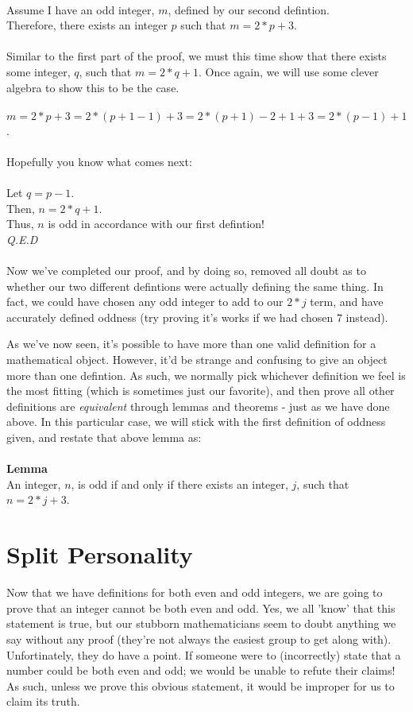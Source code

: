 \documentclass[a4paper,12pt]{article}
\begin{document}
\\
Assume I have an odd integer, $m$, defined by our second defintion.\\
Therefore, there exists an integer $p$ such that $m = 2*p + 3$.\\
\\
Similar to the first part of the proof, we must this time show that there exists some integer, $q$, such that $m = 2*q + 1$. Once again, we will use some clever algebra to show this to be the case.\\
\\
$m = 2*p + 3 = 2*(p + 1 - 1) + 3 = 2*(p + 1) - 2+1 + 3 = 2*(p - 1) + 1$.\\
\\
Hopefully you know what comes next:\\
\\
Let $q = p - 1$.\\
Then, $n = 2*q + 1$.\\
Thus, $n$ is odd in accordance with our first defintion!\\
\textit{Q.E.D}\\
\\
Now we've completed our proof, and by doing so, removed all doubt as to whether our two different defintions were actually defining the same thing. In fact, we could have chosen any odd integer to add to our $2*j$ term, and have accurately defined oddness (try proving it's works if we had chosen $7$ instead). 

As we've now seen, it's possible to have more than one valid definition for a mathematical object. However, it'd be strange and confusing to give an object more than one defintion. As such, we normally pick whichever definition we feel is the most fitting (which is sometimes just our favorite), and then prove all other definitions are \textit{equivalent} through lemmas and theorems - just as we have done above. In this particular case, we will stick with the first definition of oddness given, and restate that above lemma as:\\
\\
\textbf{Lemma}\\
An integer, $n$, is odd if and only if there exists an integer, $j$, such that $n = 2*j + 3$.   

\section{Split Personality}
Now that we have definitions for both even and odd integers, we are going to prove that an integer cannot be both even and odd. Yes, we all 'know' that this statement is true, but our stubborn mathematicians seem to doubt anything we say without any proof (they're not always the easiest group to get along with). Unfortinately, they do have a point. If someone were to (incorrectly) state that a number could be both even and odd; we would be unable to refute their claims! As such, unless we prove this obvious statement, it would be improper for us to claim its truth.
\end{document}
